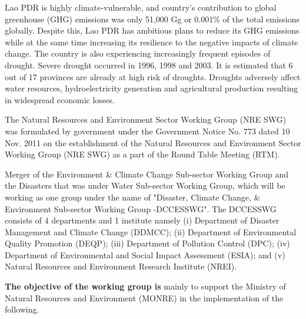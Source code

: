 	\tab Lao PDR is highly climate-vulnerable, and country's contribution to global greenhouse (GHG) emissions was only 51,000 Gg or 0.001\% of the total emissions globally. Despite this, Lao PDR has ambitious plans to reduce its GHG emissions while at the same time increasing its resilience to the negative impacts of climate change. The country is also experiencing increasingly frequent episodes of drought. Severe drought occurred in 1996, 1998 and 2003. It is estimated that 6 out of 17 provinces are already at high risk of droughts. Droughts adversely affect water resources, hydroelectricity generation and agricultural production resulting in widespread economic losses. 

\vspace{0.4 cm}

The Natural Resources and Environment Sector Working Group (NRE SWG) was formulated by government under the Government Notice No. 773 dated 10 Nov. 2011 on the establishment of the Natural Resources and Environment Sector Working Group (NRE SWG) as a part of the Round Table Meeting (RTM). 

\vspace{0.4 cm}

Merger of the Environment \& Climate Change Sub-sector Working Group and the Disasters that was under Water Sub-sector Working Group, which will be working as one group under the name of "Disaster, Climate Change, \& Environment Sub-sector Working Group -DCCESSWG". The DCCESSWG consists of 4 departments and 1 institute namely (i) Department of Disaster Management and Climate Change (DDMCC); (ii) Department of Environmental Quality Promotion (DEQP); (iii) Department of Pollution Control (DPC); (iv) Department of Environmental and Social Impact Assessment (ESIA); and (v) Natural Resources and Environment Research Institute (NREI).

\vspace{0.4 cm}

\textbf{The objective of the working group is} mainly to support the Ministry of Natural Resources and Environment (MONRE) in the implementation of the following.

